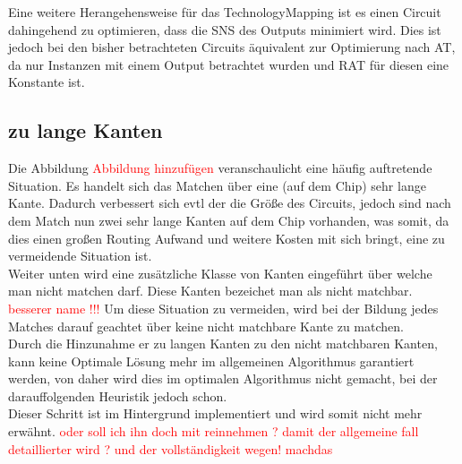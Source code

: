 \documentclass[11pt, a4paper, german]{article}
\newcommand{\TM}{TechnologyMapping }
\begin{document}
Eine weitere Herangehensweise für das \TM ist es einen Circuit dahingehend zu optimieren, dass die SNS des Outputs minimiert wird. Dies ist jedoch bei den bisher betrachteten Circuits äquivalent zur Optimierung nach AT, da nur Instanzen mit einem Output betrachtet wurden und RAT für diesen eine Konstante ist.


\subsection{zu lange Kanten}
Die Abbildung \textcolor{red}{Abbildung hinzufügen} veranschaulicht eine häufig auftretende Situation. Es handelt sich das Matchen über eine (auf dem Chip) sehr lange Kante. Dadurch verbessert sich evtl der die Größe des Circuits, jedoch sind nach dem Match nun zwei sehr lange Kanten auf dem Chip vorhanden, was somit, da dies einen großen Routing Aufwand und weitere Kosten mit sich bringt, eine zu vermeidende Situation ist. \\
Weiter unten wird eine zusätzliche Klasse von Kanten eingeführt über welche man nicht matchen darf.
Diese Kanten bezeichet man als nicht matchbar. \textcolor{red}{besserer name !!!}
Um diese Situation zu vermeiden, wird bei der Bildung jedes Matches darauf geachtet über keine nicht matchbare Kante zu matchen.\\
Durch die Hinzunahme er zu langen Kanten zu den nicht matchbaren Kanten, kann keine Optimale Lösung mehr im allgemeinen Algorithmus garantiert werden, von daher wird dies im optimalen Algorithmus nicht gemacht, bei der darauffolgenden Heuristik jedoch schon. \\
Dieser Schritt ist im Hintergrund implementiert und wird somit nicht mehr erwähnt.
\textcolor{red}{oder soll ich ihn doch mit reinnehmen ? damit der allgemeine fall detaillierter wird ? und der vollständigkeit wegen! machdas  }
\end{document}
